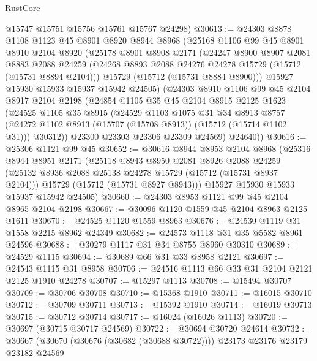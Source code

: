 \begin{lexlean}{RustCore}
\begin{coremodule}
      @15747
      @15751
      @15756
      @15761
      @15767
      @24298)
@30613 := @24303
    @8878
    @1108
    @1123
    @45
    @8901
    @8920
    @8944
    @8968
    (@25168
      @1106
      @99
      @45
      @8901
      @8910
      @2104
      @8920
      (@25178
        @8901
        @8908
        @2171
        (@24247
          @8900
          @8907
          @2081
          @8883
          @2088
          @24259
          (@24268 @8893 @2088 @24276 @24278 @15729 (@15712 (@15731 @8894 @2104)))
          @15729
          (@15712 (@15731 @8884 @8900)))
        @15927
        @15930
        @15933
        @15937
        @15942
        @24505)
      (@24303
        @8910
        @1106
        @99
        @45
        @2104
        @8917
        @2104
        @2198
        (@24854
          @1105
          @35
          @45
          @2104
          @8915
          @2125
          @1623
          (@24525
            @1105
            @35
            @8915
            (@24529
              @1103
              @1075
              @31
              @34
              @8913
              @8757
              (@24272 @1102 @8913 (@15707 (@15708 @8913)) (@15712 (@15714 @1102 @31)))
              @30312))
          @23300
          @23303
          @23306
          @23309
          @24569)
        @24640))
@30616 := @25306 @1121 @99 @45
@30652 := @30616
    @8944
    @8953
    @2104
    @8968
    (@25316
      @8944
      @8951
      @2171
      (@25118
        @8943
        @8950
        @2081
        @8926
        @2088
        @24259
        (@25132 @8936 @2088 @25138 @24278 @15729 (@15712 (@15731 @8937 @2104)))
        @15729
        (@15712 (@15731 @8927 @8943)))
      @15927
      @15930
      @15933
      @15937
      @15942
      @24505)
@30660 := @24303 @8953 @1121 @99 @45 @2104 @8965 @2104 @2198
@30667 := @30096 @1120 @1559 @45 @2104 @8963 @2125 @1611
@30670 := @24525 @1120 @1559 @8963
@30676 := @24530 @1119 @31 @1558 @2215 @8962 @24349
@30682 := @24573 @1118 @31 @35 @5582 @8961 @24596
@30688 := @30279 @1117 @31 @34 @8755 @8960 @30310
@30689 := @24529 @1115
@30694 := @30689 @66 @31 @33 @8958 @2121
@30697 := @24543 @1115 @31 @8958
@30706 := @24516 @1113 @66 @33 @31 @2104 @2121 @2125 @1910 @24278
@30707 := @15297 @1113
@30708 := @15494 @30707
@30709 := @30706 @30708
@30710 := @15368 @1910
@30711 := @16015 @30710
@30712 := @30709 @30711
@30713 := @15392 @1910
@30714 := @16019 @30713
@30715 := @30712 @30714
@30717 := @16024 (@16026 @1113)
@30720 := @30697 (@30715 @30717 @24569)
@30722 := @30694 @30720 @24614
@30732 := @30667 (@30670 (@30676 (@30682 (@30688 @30722)))) @23173 @23176 @23179 @23182 @24569

\end{coremodule}
\end{lexlean}
